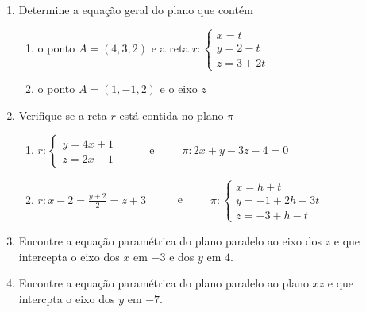 \documentclass{article}
\begin{document}
\begin{enumerate}
\item Determine a equa\c{c}\~ao geral do plano que cont\'em

\begin{enumerate}
	\item o ponto $A = (4, 3, 2)$ e a reta
		$r:\left\{\begin{array}{l}
			x = t \\
			y = 2 -t \\
			z = 3 + 2t
		\end{array}\right.$

	\item o ponto $A = (1, -1, 2)$ e o eixo $z$
\end{enumerate}

\item Verifique se a reta $r$ est\'a contida no plano $\pi$

\begin{enumerate}
	\item 
		$r:\left\{\begin{array}{l}
			y = 4x + 1 \\
			z = 2x - 1
		\end{array}\right.$
	\ \ \ \ \ e\ \ \ \ \ 
		$\pi:2x + y - 3z - 4 = 0$
	
	\item
		$r: x-2 = \frac{y+2}{2} = z+3$
	\ \ \ \ \ e\ \ \ \ \ 
		$\pi:\left\{\begin{array}{l}
			x = h + t \\
			y = -1 + 2h - 3t \\
			z = -3 + h -t
		\end{array}\right.$

\end{enumerate}

\item Encontre a equa\c{c}\~ao param\'etrica do plano paralelo ao eixo dos $z$ e que intercepta o eixo dos $x$ em $-3$ e dos $y$ em $4$.

\item Encontre a equa\c{c}\~ao param\'etrica do plano paralelo ao plano $xz$ e que intercpta o eixo dos $y$ em $-7$.

\end{enumerate}
\end{document}
